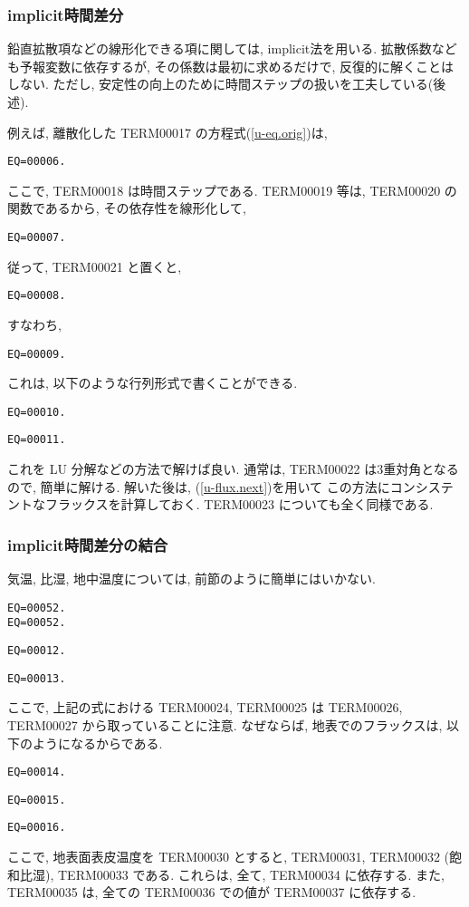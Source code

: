 \subsubsection{implicit時間差分}

鉛直拡散項などの線形化できる項に関しては, implicit法を用いる.
拡散係数なども予報変数に依存するが,
その係数は最初に求めるだけで, 反復的に解くことはしない.
ただし, 安定性の向上のために時間ステップの扱いを工夫している(後述). 

例えば, 離散化した TERM00017 の方程式(\ref{u-eq.orig})は,
%
\begin{verbatim}
EQ=00006.
\end{verbatim}
ここで, TERM00018 は時間ステップである.
TERM00019 等は, TERM00020 の関数であるから, その依存性を線形化して,
%
\begin{verbatim}
EQ=00007.
\end{verbatim}

従って, TERM00021 と置くと,
%
\begin{verbatim}
EQ=00008.
\end{verbatim}
%
すなわち,
\begin{verbatim}
EQ=00009.
\end{verbatim}

これは, 以下のような行列形式で書くことができる.
%
\begin{verbatim}
EQ=00010.
\end{verbatim}
%
\begin{verbatim}
EQ=00011.
\end{verbatim}
%
これを LU 分解などの方法で解けば良い.
通常は, TERM00022 は3重対角となるので, 簡単に解ける.
解いた後は, (\ref{u-flux.next})を用いて
この方法にコンシステントなフラックスを計算しておく.
TERM00023 についても全く同様である.

\subsubsection{implicit時間差分の結合}

気温, 比湿, 地中温度については, 前節のように簡単にはいかない.
%
\begin{verbatim}
EQ=00052.
EQ=00052.
\end{verbatim}
%
\begin{verbatim}
EQ=00012.
\end{verbatim}
%
\begin{verbatim}
EQ=00013.
\end{verbatim}
%
ここで, 上記の式における TERM00024, TERM00025 は
TERM00026, TERM00027 から取っていることに注意. なぜならば,
地表でのフラックスは, 以下のようになるからである.
\begin{verbatim}
EQ=00014.
\end{verbatim}
\begin{verbatim}
EQ=00015.
\end{verbatim}
\begin{verbatim}
EQ=00016.
\end{verbatim}
ここで, 地表面表皮温度を TERM00030 とすると,
TERM00031, TERM00032 (飽和比湿), TERM00033 である.
これらは, 全て, TERM00034 に依存する.
また, TERM00035 は, 全ての TERM00036 での値が TERM00037 に依存する. 

